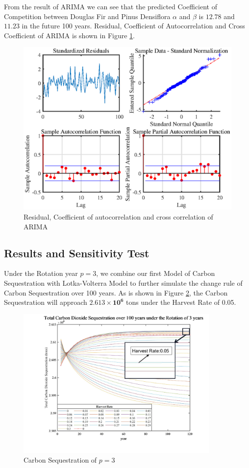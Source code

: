 \documentclass{mcmthesis}
\numberwithin{figure}{section}
\numberwithin{table}{section}
\numberwithin{equation}{section}
\begin{document}
From the result of ARIMA we can see that the predicted Coefficient of Competition
between  Douglas Fir and Pinus Densiflora $ \alpha  $ and $ \beta $ is $ \bm{12.78} $  and $ \bm{11.23}$
in the future 100 years. Residual, Coefficient of Autocorrelation and Cross Coefficient
of ARIMA is shown in Figure \ref{ARIMA Res}.

\begin{figure}[htbp]
  \centering
  \includegraphics[width = 12cm]{code&pic/ARIMA残差&自相关互相关系数.eps}
  \caption{Residual, Coefficient of autocorrelation and cross correlation of ARIMA}\label{ARIMA Res}
\end{figure}

\newpage

\subsection{Results and Sensitivity Test}\label{applicationResult}
Under the Rotation year $ p = 3 $, we combine our first Model of Carbon Sequestration
with Lotka-Volterra Model to further simulate the change rule of Carbon Sequestration 
over 100 years. As is shown in Figure \ref{Rotation3}, the Carbon Sequestration will
approach $ \bm{2.613\times 10^6} $ tons under the Harvest Rate of 0.05.

\begin{figure}[htbp]
  \centering
  \includegraphics[width = 10cm]{code&pic/轮伐3年.pdf}
  \caption{Carbon Sequestration of $ p=3 $ }\label{Rotation3}
\end{figure}
\end{document}
